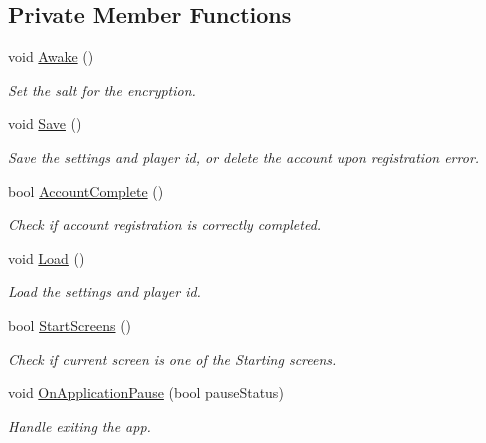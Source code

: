 \subsection*{Private Member Functions}
\begin{DoxyCompactItemize}
\item 
void \mbox{\hyperlink{class_pause_manager_a655b826847bdc4c8721d35aa47a4c880}{Awake}} ()
\begin{DoxyCompactList}\small\item\em Set the salt for the encryption. \end{DoxyCompactList}\item 
void \mbox{\hyperlink{class_pause_manager_a0150346b902b664ce65d5e1b840d9d4d}{Save}} ()
\begin{DoxyCompactList}\small\item\em Save the settings and player id, or delete the account upon registration error. \end{DoxyCompactList}\item 
bool \mbox{\hyperlink{class_pause_manager_a3afaaf8ca6d30581f6df12d900d0e1b5}{Account\+Complete}} ()
\begin{DoxyCompactList}\small\item\em Check if account registration is correctly completed. \end{DoxyCompactList}\item 
void \mbox{\hyperlink{class_pause_manager_a8666e6da14b6f6b2287e34c5775e21c7}{Load}} ()
\begin{DoxyCompactList}\small\item\em Load the settings and player id. \end{DoxyCompactList}\item 
bool \mbox{\hyperlink{class_pause_manager_a9a9453e92a60de1d20cf37c9e55ded0d}{Start\+Screens}} ()
\begin{DoxyCompactList}\small\item\em Check if current screen is one of the Starting screens. \end{DoxyCompactList}\item 
void \mbox{\hyperlink{class_pause_manager_adccb03eddbe4377a0153565456c92325}{On\+Application\+Pause}} (bool pause\+Status)
\begin{DoxyCompactList}\small\item\em Handle exiting the app. \end{DoxyCompactList}\end{DoxyCompactItemize}
